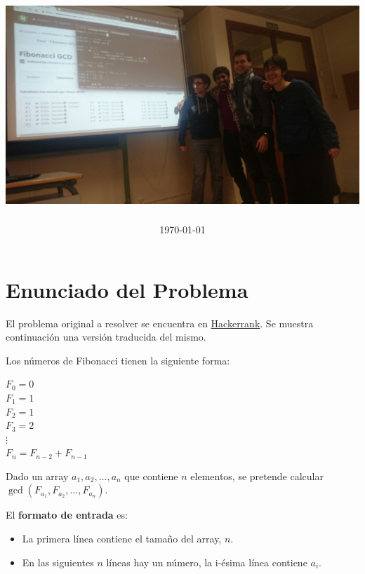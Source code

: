 \documentclass{article}
\title{                                             %
    \textmd{\textbf{\asignatura \\ \titulo}} \\         %
    \vspace{2cm}
    \includegraphics[width=15.5cm]{FibonacciGCD.jpg}    %
    \vspace{1cm}
}
\author{\textbf{\autor}}                            %
\date{\today}                                       %
\theoremstyle{theorem-style}  %
\theoremstyle{definition}
\theoremstyle{example-style}
\begin{document}
\maketitle

\makeatletter\renewcommand{\ALG@name}{Algoritmo}
\renewcommand{\listalgorithmname}{Lista de \ALG@name s} \makeatother



\newpage

\section*{Enunciado del Problema}
    El problema original a resolver se encuentra en \href{https://www.hackerrank.com/contests/infinitum9/challenges/fibonacci-gcd}{Hackerrank}. Se muestra  continuación una versión traducida del mismo.

    Los números de Fibonacci tienen la siguiente forma:
    
    \begin{center}
        $F_0 = 0$\\
        $F_1 = 1$\\
        $F_2 = 1$\\
        $F_3 = 2$\\
        $\vdots$\\
        $F_n = F_{n-2} + F_{n-1}$
    \end{center}
    
    Dado un array $a_1,a_2,\dots,a_n$ que contiene $n$ elementos, se pretende calcular $\gcd(F_{a_1},F_{a_2},\dots,F_{a_n})$.
    
    El \textbf{formato de entrada} es:
    \begin{itemize}
        \item La primera línea contiene el tamaño del array, $n$.
        \item En las siguientes $n$ líneas hay un número, la i-ésima línea contiene $a_i$.
    \end{itemize} 
    
\end{document}
